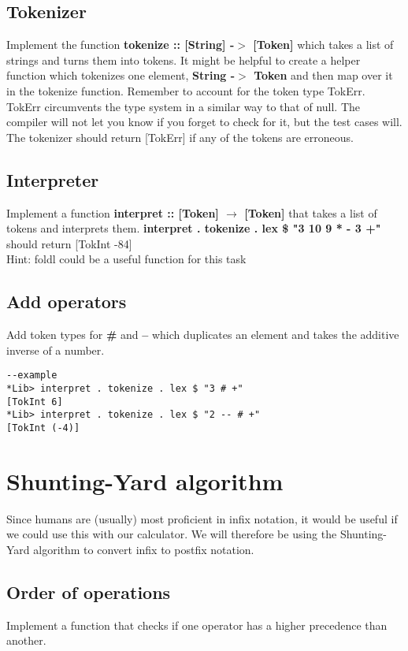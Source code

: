 \documentclass{article}
\begin{document}
\subsection{Tokenizer}
Implement the function \textbf{tokenize :: [String] -$>$ [Token]} which takes a list of strings and turns them into tokens. It might be helpful to create a helper function which tokenizes one element, \textbf{String -$>$ Token} and then map over it in the tokenize function. Remember to account for the token type TokErr. TokErr circumvents the type system in a similar way to that of null. The compiler will not let you know if you forget to check for it, but the test cases will. The tokenizer should return [TokErr] if any of the tokens are erroneous.

\subsection{Interpreter}
Implement a function \textbf{interpret :: [Token] $\rightarrow$ [Token]} that takes a list of tokens and interprets them. \textbf{interpret . tokenize . lex \$ "3 10 9 * - 3 +"} should return [TokInt -84]\\
Hint: foldl could be a useful function for this task

\subsection{Add operators}
Add token types for \textbf{\#} and \textbf{--} which duplicates an element and takes the additive inverse of a number.
\begin{lstlisting}
--example
*Lib> interpret . tokenize . lex $ "3 # +"
[TokInt 6]
*Lib> interpret . tokenize . lex $ "2 -- # +"
[TokInt (-4)]
\end{lstlisting}

\section{Shunting-Yard algorithm}
Since humans are (usually) most proficient in infix notation, it would be useful if we could use this with our calculator. We will therefore be using the Shunting-Yard algorithm to convert infix to postfix notation.

\subsection{Order of operations}
Implement a function that checks if one operator has a higher precedence than another.
\end{document}

